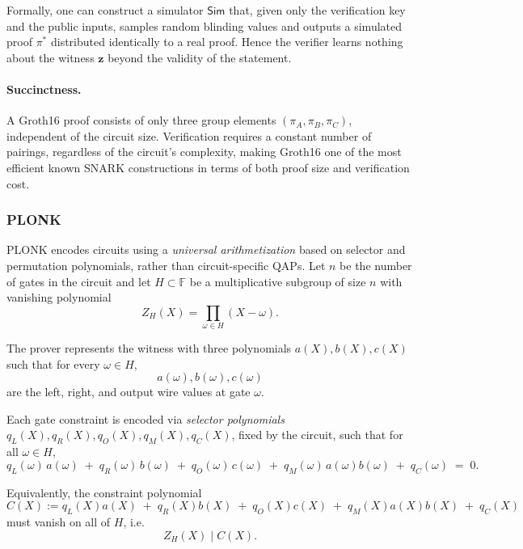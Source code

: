 Formally, one can construct a simulator $\mathsf{Sim}$ that, given only the verification key and the public inputs, 
samples random blinding values and outputs a simulated proof $\pi^*$ distributed identically to 
a real proof.  
Hence the verifier learns nothing about the witness $\mathbf{z}$ beyond the validity of the statement.

\paragraph{Succinctness.}
A Groth16 proof consists of only three group elements $(\pi_A,\pi_B,\pi_C)$, 
independent of the circuit size. 
Verification requires a constant number of pairings, regardless of the 
circuit’s complexity, making Groth16 one of the most efficient known 
SNARK constructions in terms of both proof size and verification cost.

\subsubsection{PLONK}

PLONK encodes circuits using a \emph{universal arithmetization} based on 
selector and permutation polynomials, rather than circuit-specific QAPs. 
Let $n$ be the number of gates in the circuit and let $H \subset \mathbb{F}$ 
be a multiplicative subgroup of size $n$ with vanishing polynomial
\[
Z_H(X) = \prod_{\omega \in H} (X - \omega).
\]

The prover represents the witness with three polynomials 
$a(X), b(X), c(X)$ such that for every $\omega \in H$,
\[
a(\omega), b(\omega), c(\omega)
\]
are the left, right, and output wire values at gate $\omega$.

Each gate constraint is encoded via \emph{selector polynomials} 
$q_L(X), q_R(X), q_O(X), q_M(X), q_C(X)$, fixed by the circuit, such that 
for all $\omega \in H$,
\[
q_L(\omega)\,a(\omega) \;+\; q_R(\omega)\,b(\omega) \;+\;
q_O(\omega)\,c(\omega) \;+\; q_M(\omega)\,a(\omega)b(\omega) \;+\; q_C(\omega) \;=\; 0.
\]

Equivalently, the constraint polynomial
\[
C(X) := q_L(X)a(X) \;+\; q_R(X)b(X) \;+\; q_O(X)c(X) \;+\; q_M(X)a(X)b(X) \;+\; q_C(X)
\]
must vanish on all of $H$, i.e.
\[
Z_H(X) \;\big|\; C(X).
\]

